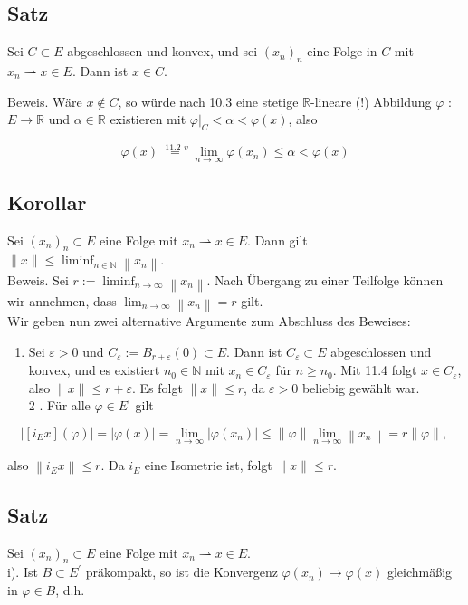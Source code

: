 \documentclass[10pt, letterpaper]{article}
\begin{document}
\subsection*{Satz}
Sei $C \subset E$ abgeschlossen und konvex, und sei $\left(x_{n}\right)_{n}$ eine Folge in $C$ mit $x_{n} \rightharpoonup x \in E$. Dann ist $x \in C$.

Beweis. Wäre $x \notin C$, so würde nach 10.3 eine stetige $\mathbb{R}$-lineare (!) Abbildung $\varphi$ : $E \rightarrow \mathbb{R}$ und $\alpha \in \mathbb{R}$ existieren mit $\left.\varphi\right|_{C}<\alpha<\varphi(x)$, also

$$
\varphi(x) \stackrel{\text { 11.2 } v}{=} \lim _{n \rightarrow \infty} \varphi\left(x_{n}\right) \leq \alpha<\varphi(x)
$$

\subsection*{Korollar}
Sei $\left(x_{n}\right)_{n} \subset E$ eine Folge mit $x_{n} \rightharpoonup x \in E$. Dann gilt $\|x\| \leq \liminf _{n \in \mathbb{N}}\left\|x_{n}\right\|$.\\
Beweis. Sei $r:=\liminf _{n \rightarrow \infty}\left\|x_{n}\right\|$. Nach Übergang zu einer Teilfolge können wir annehmen, dass $\lim _{n \rightarrow \infty}\left\|x_{n}\right\|=r$ gilt.\\
Wir geben nun zwei alternative Argumente zum Abschluss des Beweises:

\begin{enumerate}
  \item Sei $\varepsilon>0$ und $C_{\varepsilon}:=B_{r+\varepsilon}(0) \subset E$. Dann ist $C_{\varepsilon} \subset E$ abgeschlossen und konvex, und es existiert $n_{0} \in \mathbb{N}$ mit $x_{n} \in C_{\varepsilon}$ für $n \geq n_{0}$. Mit 11.4 folgt $x \in C_{\varepsilon}$, also $\|x\| \leq r+\varepsilon$. Es folgt $\|x\| \leq r$, da $\varepsilon>0$ beliebig gewählt war.\\
2 . Für alle $\varphi \in E^{\prime}$ gilt
\end{enumerate}

$$
\left|\left[i_{E} x\right](\varphi)\right|=|\varphi(x)|=\lim _{n \rightarrow \infty}\left|\varphi\left(x_{n}\right)\right| \leq\|\varphi\| \lim _{n \rightarrow \infty}\left\|x_{n}\right\|=r\|\varphi\| \text {, }
$$

also $\left\|i_{E} x\right\| \leq r$. Da $i_{E}$ eine Isometrie ist, folgt $\|x\| \leq r$.

\subsection*{Satz}
Sei $\left(x_{n}\right)_{n} \subset E$ eine Folge mit $x_{n} \rightharpoonup x \in E$.\\
i). Ist $B \subset E^{\prime}$ präkompakt, so ist die Konvergenz $\varphi\left(x_{n}\right) \rightarrow \varphi(x)$ gleichmäßig in $\varphi \in B$, d.h.
\end{document}
